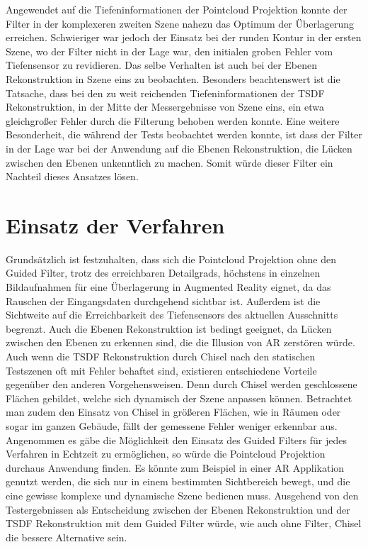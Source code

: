 Angewendet auf die Tiefeninformationen der Pointcloud Projektion konnte der Filter in der komplexeren zweiten Szene nahezu das Optimum der Überlagerung erreichen. Schwieriger war jedoch der Einsatz bei der runden Kontur in der ersten Szene, wo der Filter nicht in der Lage war, den initialen groben Fehler vom Tiefensensor zu revidieren. Das selbe Verhalten ist auch bei der Ebenen Rekonstruktion in Szene eins zu beobachten. Besonders beachtenswert ist die Tatsache, dass bei den zu weit reichenden Tiefeninformationen der TSDF Rekonstruktion, in der Mitte der Messergebnisse von Szene eins, ein etwa gleichgroßer Fehler durch die Filterung behoben werden konnte. Eine weitere Besonderheit, die während der Tests beobachtet werden konnte, ist dass der Filter in der Lage war bei der Anwendung auf die Ebenen Rekonstruktion, die Lücken zwischen den Ebenen unkenntlich zu machen. Somit würde dieser Filter ein Nachteil dieses Ansatzes lösen.\\

\section{Einsatz der Verfahren}

Grundsätzlich ist festzuhalten, dass sich die Pointcloud Projektion ohne den Guided Filter, trotz des erreichbaren Detailgrads, höchstens in einzelnen Bildaufnahmen für eine Überlagerung in Augmented Reality eignet, da das Rauschen der Eingangsdaten durchgehend sichtbar ist. Außerdem ist die Sichtweite auf die Erreichbarkeit des Tiefensensors des aktuellen Ausschnitts begrenzt. Auch die Ebenen Rekonstruktion ist bedingt geeignet, da Lücken zwischen den Ebenen zu erkennen sind, die die Illusion von AR zerstören würde. Auch wenn die TSDF Rekonstruktion durch Chisel nach den statischen Testszenen oft mit Fehler behaftet sind, existieren entschiedene Vorteile gegenüber den anderen Vorgehensweisen. Denn durch Chisel werden geschlossene Flächen gebildet, welche sich dynamisch der Szene anpassen können. Betrachtet man zudem den Einsatz von Chisel in größeren Flächen, wie in Räumen oder sogar im ganzen Gebäude, fällt der gemessene Fehler weniger erkennbar aus.\\

Angenommen es gäbe die Möglichkeit den Einsatz des Guided Filters für jedes Verfahren in Echtzeit zu ermöglichen, so würde die Pointcloud Projektion durchaus Anwendung finden. Es könnte zum Beispiel in einer AR Applikation genutzt werden, die sich nur in einem bestimmten Sichtbereich bewegt, und die eine gewisse komplexe und dynamische Szene bedienen muss. Ausgehend von den Testergebnissen als Entscheidung zwischen der Ebenen Rekonstruktion und der TSDF Rekonstruktion mit dem Guided Filter würde, wie auch ohne Filter, Chisel die bessere Alternative sein.


